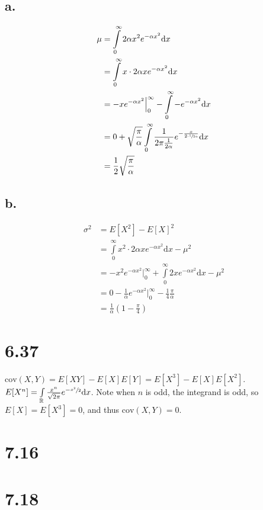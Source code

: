 \documentclass{article}
\begin{document}
\subsection*{a.}
\begin{equation*}
\begin{split}
    \mu &= \int\limits_0^\infty 2\alpha x^2e^{-\alpha x^2} \mathrm{d}x\\
    &= \int\limits_0^\infty x \cdot 2\alpha xe^{-\alpha x^2} \mathrm{d}x\\
    &= -xe^{-\alpha x^2} \Big\rvert_0^\infty - \int\limits_0^\infty -e^{-\alpha x^2} \mathrm{d}x\\
    &= 0 + \sqrt{\frac{\pi}{\alpha}}\int\limits_0^\infty \frac{1}{2\pi \frac{1}{2\alpha}}e^{-\frac{x}{2\cdot\sfrac{1}{2\alpha}}} \mathrm{d}x\\
    &= \frac{1}{2}\sqrt{\frac{\pi}{\alpha}}
\end{split}
\end{equation*}

\subsection*{b.}
\begin{equation*}
\begin{split}
    \sigma^2 &= E[X^2] - E[X]^2\\
    &= \int\limits_0^\infty x^2 \cdot 2\alpha x e^{-\alpha x^2} \mathrm{d}x - \mu^2\\
    &= -x^2e^{-\alpha x^2} \Big\rvert_0^\infty + \int\limits_0^\infty 2xe^{-\alpha x^2} \mathrm{d}x - \mu^2\\
    &= 0 - \frac{1}{\alpha}e^{-\alpha x^2} \Big\rvert_0^\infty  - \frac{1}{4}\frac{\pi}{\alpha}\\
    &= \frac{1}{\alpha}\left(1 - \frac{\pi}{4}\right)
\end{split}
\end{equation*}

\section*{6.37}
$\mathrm{cov}(X,Y) = E[XY] - E[X]E[Y] = E[X^3] - E[X]E[X^2]$.\\
$E[X^n] = \int\limits_\mathbb{R} \frac{x^n}{\sqrt{2\pi}}e^{-\sfrac{x^2}{2}} \mathrm{d}x$. Note when $n$ is odd, the integrand is odd, so $E[X] = E[X^3] = 0$, and thus $\mathrm{cov}(X,Y) = 0$.

\section*{7.16}

\section*{7.18}
\end{document}
